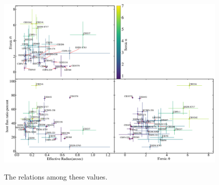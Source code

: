 \documentclass[apj]{emulateapj}
\begin{document}
\begin{figure}
\centering
{
\includegraphics[height=0.75\textwidth]{fig/flux_r_n_corner.pdf}
}
\caption{\label{fig:flux_r_n_corner} The relations among these values.}
\end{figure} 

\end{document}

